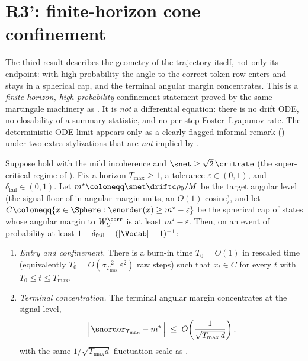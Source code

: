 \section{R3': finite-horizon cone confinement}
\label{sec:R3prime}

The third result describes the geometry of the trajectory itself, not
only its endpoint: with high probability the angle to the correct-token
row enters and stays in a spherical cap, and the terminal angular margin
concentrates. This is a \emph{finite-horizon, high-probability}
confinement statement proved by the same martingale machinery as
. It is \emph{not} a differential equation: there is
no drift ODE, no closability of a summary statistic, and no per-step
Foster--Lyapunov rate. The deterministic ODE limit appears only as a
clearly flagged informal remark () under two extra
stylizations that are \emph{not} implied by .

\begin{theorem}
\label{thm:R3prime}
Suppose  hold with the mild
incoherence  and $\snet\ge\sqrt2\,\critrate$ (the
super-critical regime of ). Fix a horizon $T_{\max}\ge1$, a
tolerance $\varepsilon\in(0,1)$, and $\delta_{\mathrm{fail}}\in(0,1)$. Let
$m^\star\coloneqq\snet\driftc\rho_0/M$ be the target angular level (the
signal floor of  in angular-margin units, an $O(1)$
cosine), and let $C\coloneqq\{x\in\Sphere:\snorder(x)\ge m^\star-\varepsilon\}$
be the spherical cap of states whose angular margin to $W_U^{\corr}$ is at
least $m^\star-\varepsilon$. Then, on an event of probability at least
$1-\delta_{\mathrm{fail}}-(|\Vocab|-1)^{-1}$:
\begin{enumerate}[label=(\roman*),leftmargin=2em,itemsep=0.2em]
\item \emph{Entry and confinement.} There is a burn-in time
       $T_0=O(1)$ in rescaled time (equivalently
       $T_0=O(\sigma_{T_{\max}}^{-2}\,\varepsilon^{2})$ raw steps) such
       that $x_t\in C$ for every $t$ with $T_0\le t\le T_{\max}$.
\item \emph{Terminal concentration.} The terminal angular margin
       concentrates at the signal level,
       \begin{align}\label{eq:R3prime_concentration}
          \Bigl|\, \snorder_{T_{\max}} - m^\star \,\Bigr|
          \;\le\;
          O\!\left(\frac{1}{\sqrt{T_{\max}\,d}}\right),
       \end{align}
       with the same $1/\sqrt{T_{\max}d}$ fluctuation scale as
       .
\end{enumerate}
\end{theorem}

